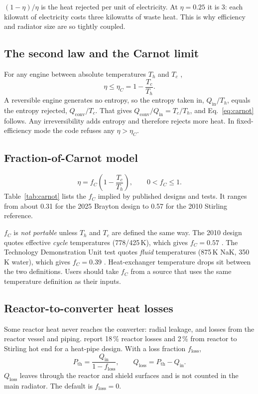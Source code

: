 \documentclass[11pt]{article}
\numberwithin{equation}{section}
\numberwithin{table}{section}
\newcommand{\Pth}{P_\text{th}}
\begin{document}
\begin{physics}
$(1-\eta)/\eta$ is the heat rejected per unit of electricity. At $\eta=0.25$ it
is 3: each kilowatt of electricity costs three kilowatts of waste heat. This is
why efficiency and radiator size are so tightly coupled.
\end{physics}

\subsection{The second law and the Carnot limit}
For any engine between absolute temperatures $T_h$ and $T_c$ \cite{smith2001thermo},
\begin{equation}
  \eta \le \eta_C = 1 - \frac{T_c}{T_h}.
  \label{eq:carnot}
\end{equation}
A reversible engine generates no entropy, so the entropy taken in,
$Q_\text{in}/T_h$, equals the entropy rejected, $Q_\text{conv}/T_c$. That gives
$Q_\text{conv}/Q_\text{in} = T_c/T_h$, and Eq.~\eqref{eq:carnot} follows. Any
irreversibility adds entropy and therefore rejects more heat. In fixed-efficiency
mode the code refuses any $\eta>\eta_C$.

\subsection{Fraction-of-Carnot model}
\begin{equation}
  \eta = f_C\left(1-\frac{T_c}{T_h}\right), \qquad 0<f_C\le 1 .
  \label{eq:fc}
\end{equation}
Table~\ref{tab:carnot} lists the $f_C$ implied by published designs and tests.
It ranges from about 0.31 for the 2025 Brayton design to 0.57 for the 2010
Stirling reference.

\begin{review}
$f_C$ is \emph{not portable} unless $T_h$ and $T_c$ are defined the same way. The
2010 design quotes effective \emph{cycle} temperatures (778/425\,K), which gives
$f_C=0.57$ \cite{fsp2010icd}. The Technology Demonstration Unit test quotes
\emph{fluid} temperatures (875\,K NaK, 350\,K water), which gives $f_C=0.39$
\cite{briggs2016tdu}. Heat-exchanger temperature drops sit between the two
definitions. Users should take $f_C$ from a source that uses the same temperature
definition as their inputs.
\end{review}

\subsection{Reactor-to-converter heat losses}\label{sec:loss}
Some reactor heat never reaches the converter: radial leakage, and losses from the
reactor vessel and piping. \textcite{oleson2022deployable} report 18\,\% reactor
losses and 2\,\% from reactor to Stirling hot end for a heat-pipe design. With a
loss fraction $f_\text{loss}$,
\begin{equation}
  \Pth = \frac{Q_\text{in}}{1-f_\text{loss}}, \qquad Q_\text{loss} = \Pth - Q_\text{in}.
  \label{eq:loss}
\end{equation}
$Q_\text{loss}$ leaves through the reactor and shield surfaces and is not counted in
the main radiator. The default is $f_\text{loss}=0$.
\end{document}
